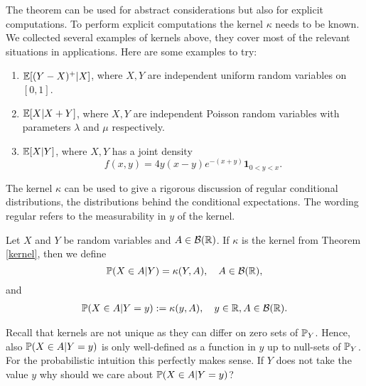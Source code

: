 The theorem can be used for abstract considerations but also for explicit computations. To perform explicit computations the kernel $\kappa$ needs to be known. We collected several examples of kernels above, they cover most of the relevant situations in applications. Here are some examples to try:
\begin{luebung}
	\begin{enumerate}[label=(\roman*)]
			\item $\E[(Y-X)^+|X]$, where $X,Y$ are independent uniform random variables on $[0,1]$.
				\item $\E[X|X+Y]$, where $X,Y$ are independent Poisson random variables with parameters $\lambda$ and $\mu$ respectively.
		\item $\E[X|Y]$, where $X,Y$ has a joint density
		\begin{equation*}
			f(x,y)=4y(x-y)e^{-(x+y)} \mathbf 1_{0<y<x}.
		\end{equation*}
	\end{enumerate}
\end{luebung}
The kernel $\kappa$ can be used to give a rigorous discussion of regular conditional distributions, the distributions behind the conditional expectations. The wording regular refers to the measurability in $y$ of the kernel.
\begin{laussagewerkzeug}
\begin{deff}
	Let $X$ and $Y$ be random variables and $A\in \mathcal B(\R)$. If $\kappa$ is the kernel from Theorem \ref{kernel}, then we define $$\P(X\in A|Y)=\kappa(Y,A),\quad A\in \mathcal B(\R),$$
	and 
	\begin{align*}
			\P(X\in A|Y=y):=\kappa(y,A),\quad y\in \R, A\in \mathcal B(\R).
	\end{align*}
\end{deff}
\end{laussagewerkzeug}

	Recall that kernels are not unique as they can differ on zero sets of $\P_Y$. Hence, also $\P(X\in A|Y=y)$ is only well-defined as a function in $y$ up to null-sets of $\P_Y$. For the probabilistic intuition this perfectly makes sense. If $Y$ does not take the value $y$ why should we care about $\P(X\in A|Y=y)$?\smallskip


